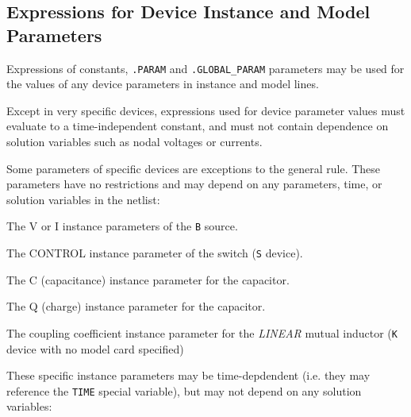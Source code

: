 \subsection{Expressions for Device Instance and Model Parameters}

Expressions of constants, \texttt{.PARAM} and \texttt{.GLOBAL\_PARAM} parameters may be used
for the values of any device parameters in instance and model lines.

Except in very specific devices, expressions used for device parameter
values must evaluate to a time-independent constant, and must not
contain dependence on solution variables such as nodal voltages or
currents.  

\begin{centering}
\end{centering}

Some parameters of specific devices are exceptions to the general
rule.  These parameters have no restrictions and may depend on any
parameters, time, or solution variables in the
netlist:
\begin{XyceItemize}
\item The \textrm{V} or \textrm{I} instance parameters of the
  \texttt{B} source.
\item The \textrm{CONTROL} instance parameter of the switch (\texttt{S}
  device).
\item The \textrm{C} (capacitance) instance parameter for the capacitor.
\item The \textrm{Q} (charge) instance parameter for the capacitor.
\item The coupling coefficient instance parameter for the {\em LINEAR}
  mutual inductor (\texttt{K} device with no model card specified)
\end{XyceItemize}

These specific instance parameters may be time-depdendent (i.e. they
may reference the \texttt{TIME} special variable), but may not depend
on any solution variables:

